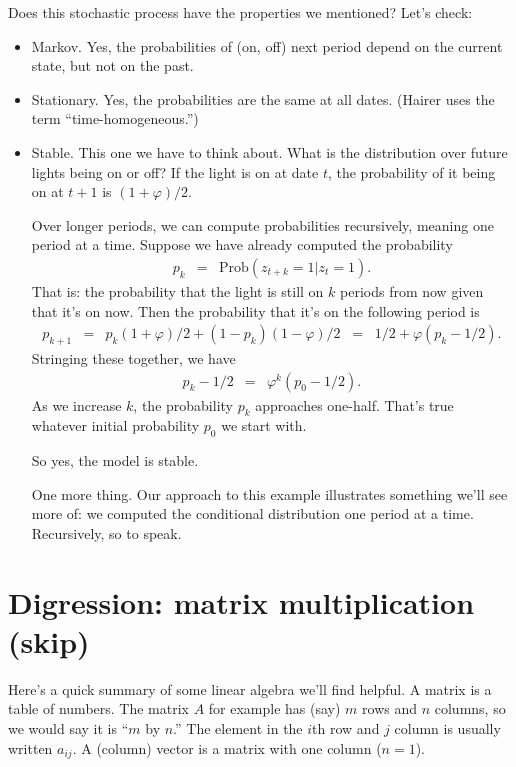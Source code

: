 \documentclass[11pt]{article}
\begin{document}
Does this stochastic process have the properties we mentioned?
Let's check:
\begin{itemize}
\item Markov.  Yes, the probabilities of (on, off) next period depend on the current state,
but not on the past.
\item Stationary.  Yes, the probabilities are the same at all dates.
(Hairer uses the term ``time-homogeneous.'')

\item Stable.  This one we have to think about.
What is the distribution over future lights being on or off?
If the light is on at date $t$, the probability of it being on at $t+1$ is $(1+\varphi)/2 $.

Over longer periods, we can compute probabilities recursively, meaning one period at a time.
Suppose we have already computed the probability
\begin{eqnarray*}
    p_k  &=& \mbox{Prob}(z_{t+k} = 1 | z_t = 1 ) .
\end{eqnarray*}
That is:  the probability that the light is still on $k$ periods from now given that it's on now.
Then the probability that it's on the following period is
\begin{eqnarray*}
    p_{k+1}  &=& p_k (1+\varphi)/2  + (1-p_k) (1-\varphi)/2
            \;\;=\;\;  1/2 + \varphi (p_k - 1/2).
\end{eqnarray*}
Stringing these together, we have
\begin{eqnarray*}
    p_{k}  - 1/2 &=& \varphi^k (p_0 - 1/2).
\end{eqnarray*}
As we increase $k$, the probability $p_k$ approaches one-half.
That's true whatever initial probability $p_0$ we start with.

So yes, the model is stable.

One more thing.
Our approach to this example illustrates something we'll see more of:
we computed the conditional distribution one period at a time.
Recursively, so to speak.

\end{itemize}


\section{Digression:  matrix multiplication (skip)}

Here's a quick summary of some linear algebra we'll find helpful.
A matrix is a table of numbers.
The matrix $A$ for example has (say) $m$ rows and $n$ columns,
so we would say it is ``$m$ by $n$.''
The element in the $i$th row and $j$ column is usually written $a_{ij}$.
A (column) vector is a matrix with one column ($n=1$).
\end{document}
